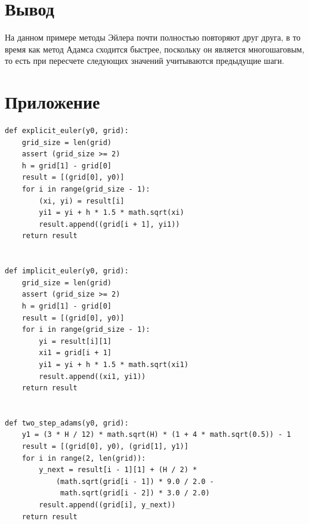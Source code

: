 \documentclass[12pt,a4paper]{article}
\begin{document}
    \section*{Вывод}
        На данном примере методы Эйлера почти полностью повторяют друг друга,
        в то время как метод Адамса сходится быстрее, поскольку он является
        многошаговым, то есть при пересчете следующих значений учитываются предыдущие
        шаги.
    \newpage
    
    \section*{Приложение}
        \begin{lstlisting}
def explicit_euler(y0, grid):
    grid_size = len(grid)
    assert (grid_size >= 2)
    h = grid[1] - grid[0]
    result = [(grid[0], y0)]
    for i in range(grid_size - 1):
        (xi, yi) = result[i]
        yi1 = yi + h * 1.5 * math.sqrt(xi)
        result.append((grid[i + 1], yi1))
    return result


def implicit_euler(y0, grid):
    grid_size = len(grid)
    assert (grid_size >= 2)
    h = grid[1] - grid[0]
    result = [(grid[0], y0)]
    for i in range(grid_size - 1):
        yi = result[i][1]
        xi1 = grid[i + 1]
        yi1 = yi + h * 1.5 * math.sqrt(xi1)
        result.append((xi1, yi1))
    return result


def two_step_adams(y0, grid):
    y1 = (3 * H / 12) * math.sqrt(H) * (1 + 4 * math.sqrt(0.5)) - 1
    result = [(grid[0], y0), (grid[1], y1)]
    for i in range(2, len(grid)):
        y_next = result[i - 1][1] + (H / 2) * 
	        (math.sqrt(grid[i - 1]) * 9.0 / 2.0 -
         	 math.sqrt(grid[i - 2]) * 3.0 / 2.0)
        result.append((grid[i], y_next))
    return result
        \end{lstlisting}
        
        
\end{document}
